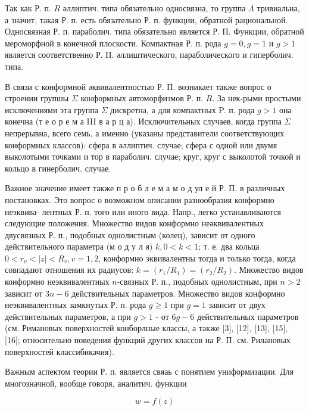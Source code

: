 \documentclass[10pt]{article}
\begin{document}
Так как Р. п. $R$ әллиптич. типа обязательно односвязна, то группа $\Lambda$ тривиальна, а значит, такая Р. п. есть обязательно Р. п. функции, обратной рациональной. Односвязная Р. п. параболич. типа обязательно является Р. П. Функции, обратной мероморфной в конечной плоскости. Компактная Р. п. рода $g=0, g=1$ и $g>1$ является соответственно Р. П. әллиштического, параболического и гиперболич. типа.



В связи с конформной әквивалентностью Р. П. возникает также вопрос о строении групшы $\Sigma$ конформных автоморфизмов Р. п. $R$. За нек-рыми простыми исключениями эта группа $\Sigma$ дискретна, а для компактных P. п. рода $g>1$ она конечна (т е о р е м а III в а р ц а). Исключительных случаев, когда группа $\Sigma$ непрерывна, всего семь, а именно (указаны представители соответствующих конформных классов): сфера в әллиптич. случае; сфера с одной или двумя выколотыми точками и тор в параболич. случае; круг, круг с выколотой точкой и кольцо в гинерболич. случае.



Важное значение имеет также п р о б л е м а м о д ул е й Р. П. в различных постановках. Это вопрос о возможном описании разнообразия конформно неэквива- лентных Р. п. того или иного вида. Напр., легко устанавливаются следующие положения. Множество видов конформно неәквивалентных двусвязных Р. п., подобных однолистным (колец), зависит от одного действительного параметра (м о д у л я) $k, 0<k<1$; т. е. два кольца $0<r_{v}<|z|<R_{v}, v=1,2$, конформно эквивалентны тогда и только тогда, когда совпадают отношения их радиусов: $k=\left(r_{1} / R_{1}\right)=\left(r_{2} / R_{2}\right)$. Множество видов конформно неэквивалентных $n$-связных Р. п., подобных однолистным, при $n>2$ зависит от $3 n-6$ действительных параметров. Множество видов конформно неэквивалентных замкнутых Р. п. рода $g \geqslant 1$ при $g=1$ зависит от двух действительных параметров, а при $g>1$ - от $6 g-6$ действительных параметров (см. Римановых поверхностей конборлные классы, а также [3], [12], [13], [15], [16]; относительно поведения функций других классов на Р. П. см. Рилановых поверхностей классибикачия).



Важным аспектом теории Р. п. является свяаь с понятием униформизации. Для многозначной, вообще говоря, аналитич. функции



\[

w=f(z)

\]
\end{document}
